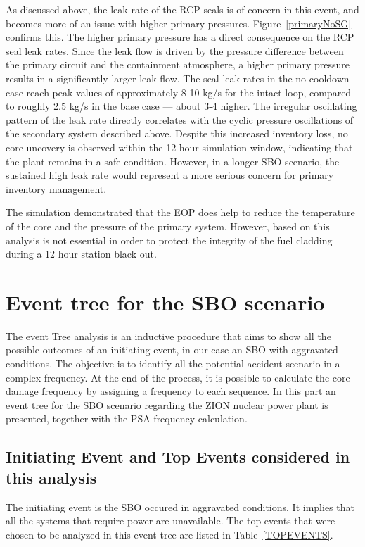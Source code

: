 \documentclass[a4paper,11pt]{article}
\numberwithin{subsubsection}{subsection}
\numberwithin{subsection}{section}
\newcommand{\figref}[1]{Figure~\ref{#1}}
\newcommand{\tabref}[1]{Table~\ref{#1}}
\begin{document}
As discussed above, the leak rate of the RCP seals is of concern in this event, and becomes more of an issue with higher primary pressures. \figref{primaryNoSG} confirms this. The higher primary pressure has a direct consequence on the RCP seal leak rates. Since the leak flow is driven by the pressure difference between the primary circuit and the containment atmosphere, a higher primary pressure results in a significantly larger leak flow. The seal leak rates in the no-cooldown case reach peak values of approximately 8-10 kg/s for the intact loop, compared to roughly 2.5 kg/s in the base case — about 3-4 higher. The irregular oscillating pattern of the leak rate directly correlates with the cyclic pressure oscillations of the secondary system described above. Despite this increased inventory loss, no core uncovery is observed within the 12-hour simulation window, indicating that the plant remains in a safe condition. However, in a longer SBO scenario, the sustained high leak rate would represent a more serious concern for primary inventory management.

The simulation demonstrated that the EOP does help to reduce the temperature of the core and the pressure of the primary system. However, based on this analysis is not essential in order to protect the integrity of the fuel cladding during a 12 hour station black out. 

\newpage 
\section{Event tree for the SBO scenario}
The event Tree analysis is an inductive procedure that aims to show all the possible outcomes of an initiating event, in our case an SBO with aggravated conditions. The objective is to identify all the potential accident scenario in a complex frequency. At the end of the process, it is possible to calculate the core damage frequency by assigning a frequency to each sequence. In this part an event tree for the SBO scenario regarding the ZION nuclear power plant is presented, together with the PSA frequency calculation. 

\subsection{Initiating Event and Top Events considered in this analysis}

The initiating event is the SBO occured in aggravated conditions. It implies that all the systems that require power are unavailable. The top events that were chosen to be analyzed in this event tree are listed in \tabref{TOPEVENTS}. 
\end{document}
